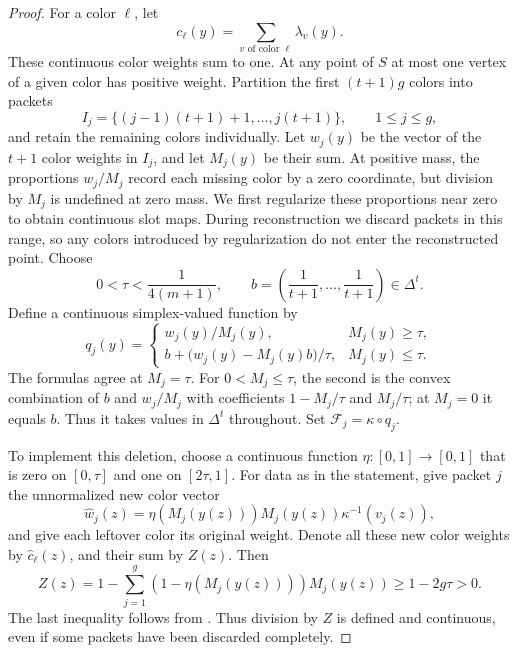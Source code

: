 \begin{proof}
For a color $\ell$, let
\[
 c_\ell(y)=\sum_{v\text{ of color }\ell}\lambda_v(y).
\]
These continuous color weights sum to one.  At any point of $S$
at most one vertex of a given color has positive weight.
Partition the first $(t+1)g$ colors into packets
\[
 I_j=\{(j-1)(t+1)+1,\ldots,j(t+1)\},
 \qquad 1\le j\le g,
\]
and retain the remaining colors individually.  Let $w_j(y)$ be
the vector of the $t+1$ color weights in $I_j$, and let
$M_j(y)$ be their sum.  At positive mass, the proportions $w_j/M_j$
record each missing color by a zero coordinate, but division by
$M_j$ is undefined at zero mass.  We first regularize these
proportions near zero to obtain continuous slot maps.  During
reconstruction we discard packets in this range, so any colors
introduced by regularization do not enter the reconstructed point.
Choose
\begin{equation}
\label{eq:packet-threshold}
 0<\tau<\frac{1}{4(m+1)},
 \qquad b=\left(\frac{1}{t+1},\ldots,\frac{1}{t+1}\right)
 \in\Delta^t.
\end{equation}
Define a continuous simplex-valued function by
\begin{equation}
\label{eq:regularized-proportions}
 q_j(y)=
 \begin{cases}
  w_j(y)/M_j(y),&M_j(y)\ge\tau,\\[2mm]
  b+\bigl(w_j(y)-M_j(y)b\bigr)/\tau,&M_j(y)\le\tau.
 \end{cases}
\end{equation}
The formulas agree at $M_j=\tau$.  For $0<M_j\le\tau$,
the second is the convex combination of $b$ and $w_j/M_j$
with coefficients $1-M_j/\tau$ and $M_j/\tau$; at $M_j=0$
it equals $b$.  Thus it takes values in $\Delta^t$ throughout.
Set $\mathcal F_j=\kappa\circ q_j$.

To implement this deletion, choose a continuous function
$\eta:[0,1]\to[0,1]$ that is zero
on $[0,\tau]$ and one on $[2\tau,1]$.  For data as in the
statement, give packet $j$ the unnormalized new color vector
\begin{equation}
\label{eq:reconstructed-packet}
 \widehat w_j(z)
   =\eta(M_j(y(z)))M_j(y(z))\kappa^{-1}(v_j(z)),
\end{equation}
and give each leftover color its original weight.  Denote all
these new color weights by $\widehat c_\ell(z)$, and their sum by
$Z(z)$.  Then
\[
 Z(z)=1-\sum_{j=1}^g
       (1-\eta(M_j(y(z))))M_j(y(z))
       \ge1-2g\tau>0.
\]
The last inequality follows from .
Thus division by $Z$ is defined and continuous, even if some
packets have been discarded completely.


\end{proof}
